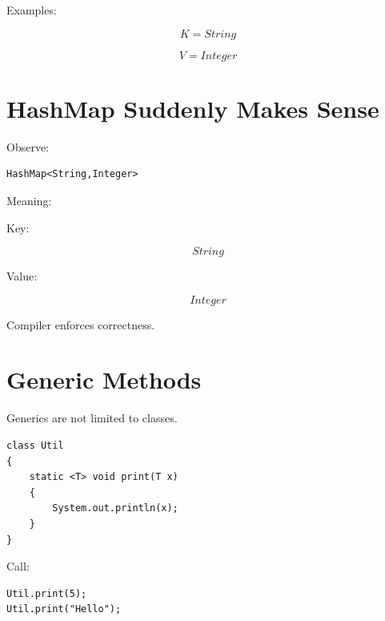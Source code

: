 \documentclass[11pt,a4paper]{book}
\begin{document}

Examples:

\[
K = String
\]


\[
V = Integer
\]


\section{HashMap Suddenly Makes Sense}

Observe:

\begin{verbatim}
HashMap<String,Integer>
\end{verbatim}


Meaning:


Key:

\[
String
\]


Value:

\[
Integer
\]


Compiler enforces correctness.


\section{Generic Methods}

Generics are not limited to classes.


\begin{verbatim}
class Util
{
    static <T> void print(T x)
    {
        System.out.println(x);
    }
}
\end{verbatim}


Call:

\begin{verbatim}
Util.print(5);
Util.print("Hello");
\end{verbatim}
\end{document}
